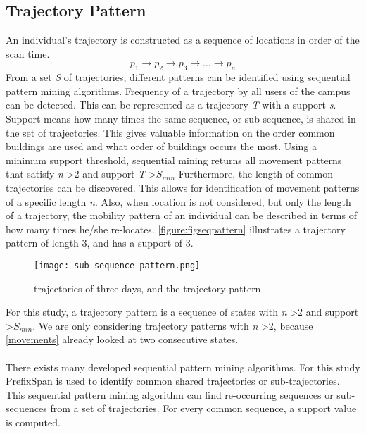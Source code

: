 \subsection{Trajectory Pattern}
An individual's trajectory is constructed as a sequence of locations in order of the scan time. 
$$p_{1} \rightarrow p_{2} \rightarrow p_{3} \rightarrow …\rightarrow p_{n}$$
From a set \textit{S} of trajectories, different patterns can be identified using sequential pattern mining algorithms. Frequency of a trajectory by all users of the campus can be detected. This can be represented as a trajectory \textit{T} with a support \textit{s}. Support means how many times the same sequence, or sub-sequence, is shared in the set of trajectories. This gives valuable information on the order common buildings are used and what order of buildings occurs the most. Using a minimum support threshold, sequential mining returns all movement patterns that satisfy \textit{n} \textgreater 2 and support \textit{T} \textgreater \textit{$S_{min}$}   Furthermore, the length of common trajectories can be discovered. This allows for identification of movement patterns of a specific length \textit{n}. Also, when location is not considered, but only the length of a trajectory, the mobility pattern of an individual can be described in terms of how many times he/she re-locates. \autoref{figure:figseqpattern} illustrates a trajectory pattern of length 3, and has a support of 3.

\begin{figure}[H]
\centering
\texttt{[image: sub-sequence-pattern.png]}
\captionsetup{justification=centering}
\caption{trajectories of three days, and the trajectory pattern}
\label{figure:figseqpattern}
\end{figure}
For this study, a trajectory pattern is a sequence of states with \textit{n} \textgreater 2 and support \textgreater \textit{$S_{min}$}. We are only considering trajectory patterns with \textit{n} \textgreater 2, because \autoref{movements} already looked at two consecutive states.\\\\
There exists many developed sequential pattern mining algorithms. For this study PrefixSpan \cite{pei2004mining} is used to identify common shared trajectories or sub-trajectories. This sequential pattern mining algorithm can find re-occurring sequences or sub-sequences from a set of trajectories. For every common sequence, a support value is computed. 
